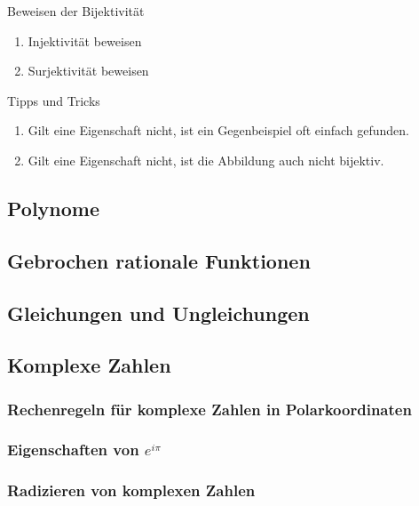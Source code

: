 \documentclass[german]{spicker}
\begin{document}
\begin{algo}{Beweisen der Bijektivität}
    \begin{enumerate}
        \item Injektivität beweisen
        \item Surjektivität beweisen
    \end{enumerate}
\end{algo}

\begin{bonus}{Tipps und Tricks}
    \begin{enumerate}
        \item Gilt eine Eigenschaft nicht, ist ein Gegenbeispiel oft einfach gefunden.
        \item Gilt eine Eigenschaft nicht, ist die Abbildung auch nicht bijektiv.
    \end{enumerate}
\end{bonus}

\subsection{Polynome}

\subsection{Gebrochen rationale Funktionen}

\subsection{Gleichungen und Ungleichungen}

\subsection{Komplexe Zahlen}
\subsubsection{Rechenregeln für komplexe Zahlen in Polarkoordinaten}

\subsubsection{Eigenschaften von $e^{i\pi}$}

\subsubsection{Radizieren von komplexen Zahlen}
\end{document}
